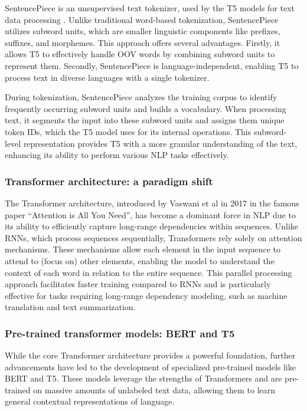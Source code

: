 \documentclass[12pt]{article}
\begin{document}
SentencePiece is an unsupervised text tokenizer, used by the T5 models for text data processing \cite{Kudo2018}. Unlike traditional word-based tokenization, SentencePiece utilizes subword units, which are smaller linguistic components like prefixes, suffixes, and morphemes. This approach offers several advantages. Firstly, it allows T5 to effectively handle OOV words by combining subword units to represent them. Secondly, SentencePiece is language-independent, enabling T5 to process text in diverse languages with a single tokenizer.

During tokenization, SentencePiece analyzes the training corpus to identify frequently occurring subword units and builds a vocabulary. When processing text, it segments the input into these subword units and assigns them unique token IDs, which the T5 model uses for its internal operations. This subword-level representation provides T5 with a more granular understanding of the text, enhancing its ability to perform various NLP tasks effectively.

\subsubsection{Transformer architecture: a paradigm shift}

The Transformer architecture, introduced by Vaswani et al \cite{Vaswani2017} in 2017 in the famous paper “Attention is All You Need”, has become a dominant force in NLP due to its ability to efficiently capture long-range dependencies within sequences. Unlike RNNs, which process sequences sequentially, Transformers rely solely on attention mechanisms. These mechanisms allow each element in the input sequence to attend to (focus on) other elements, enabling the model to understand the context of each word in relation to the entire sequence. This parallel processing approach facilitates faster training compared to RNNs and is particularly effective for tasks requiring long-range dependency modeling, such as machine translation and text summarization.

\subsubsection{Pre-trained transformer models: BERT and T5}

While the core Transformer architecture provides a powerful foundation, further advancements have led to the development of specialized pre-trained models like BERT and T5. These models leverage the strengths of Transformers and are pre-trained on massive amounts of unlabeled text data, allowing them to learn general contextual representations of language.
\end{document}
